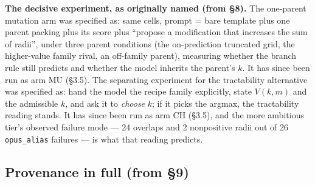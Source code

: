\textbf{The decisive experiment, as originally named (from \S8).} The one-parent mutation arm was
specified as: same cells, prompt = bare template plus one parent packing plus its score plus
``propose a modification that increases the sum of radii'', under three parent conditions (the
on-prediction truncated grid, the higher-value family rival, an off-family parent), measuring
whether the branch rule still predicts and whether the model inherits the parent's $k$. It has
since been run as arm MU (\S3.5). The separating experiment for the tractability alternative was
specified as: hand the model the recipe family explicitly, state $V(k, m)$ and the admissible $k$,
and ask it to \emph{choose} $k$; if it picks the argmax, the tractability reading stands. It has
since been run as arm CH (\S3.5), and the more ambitious tier's observed failure mode --- 24
overlaps and 2 nonpositive radii out of 26 \texttt{opus\_alias} failures --- is what that reading
predicts.

\subsection{Provenance in full (from \S9)}


